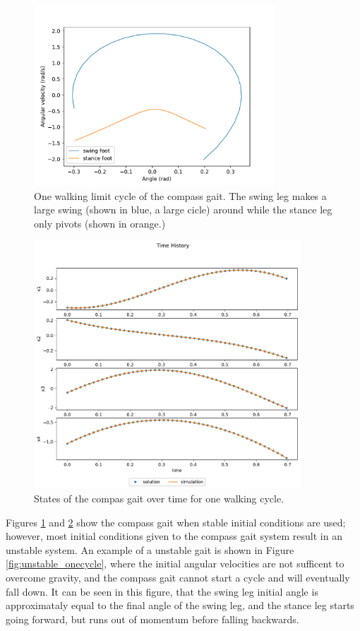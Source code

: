 \documentclass[smallextended]{./springer/svjour3}
\begin{document}
\begin{figure}[!h]
\centering
\includegraphics[width=9cm]{./figures/onecycle.pdf}
\caption{One walking limit cycle of the compass gait. The swing leg makes a large swing (shown in blue, a large cicle) around while the stance leg only pivots (shown in orange.)}
\label{fig:onecycle}
\end{figure}

\begin{figure}[h]
\centering
\includegraphics[width=10cm]{./figures/states_onecycle.pdf}
\caption{States of the compas gait over time for one walking cycle.}
\label{fig:states_onecycle}
\end{figure}

Figures \ref{fig:onecycle} and \ref{fig:states_onecycle} show the compass gait when stable initial conditions are used; however, most initial conditions
given to the compass gait system result in an unstable system. An example of a unstable gait is shown in Figure \ref{fig:unstable_onecycle}, where the initial angular velocities are 
not sufficent to overcome gravity, and the compass gait cannot start a cycle and will eventually fall down. It can be seen in this figure, that the swing leg initial angle 
is approximataly equal to the final angle of the swing leg, and the stance leg starts going forward, but runs out of momentum before falling backwards.
\end{document}
